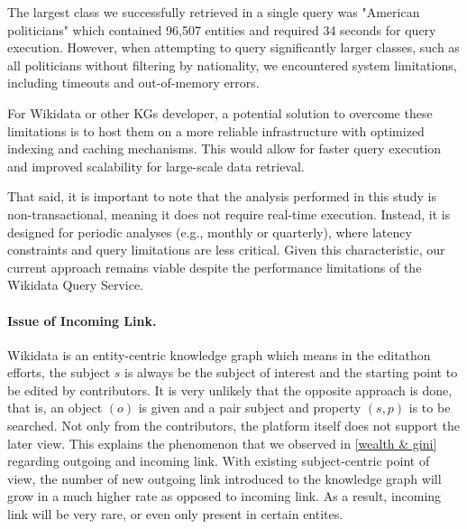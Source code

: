 The largest class we successfully retrieved in a single query was "American politicians" which contained 96,507 entities and required 34 seconds for query execution. However, when attempting to query significantly larger classes, such as all politicians without filtering by nationality, we encountered system limitations, including timeouts and out-of-memory errors.

For Wikidata or other KGs developer, a potential solution to overcome these limitations is to host them on a more reliable infrastructure with optimized indexing and caching mechanisms. This would allow for faster query execution and improved scalability for large-scale data retrieval.

That said, it is important to note that the analysis performed in this study is non-transactional, meaning it does not require real-time execution. Instead, it is designed for periodic analyses (e.g., monthly or quarterly), where latency constraints and query limitations are less critical. Given this characteristic, our current approach remains viable despite the performance limitations of the Wikidata Query Service.


\paragraph{Issue of Incoming Link.}
Wikidata is an entity-centric knowledge graph which means in the editathon efforts, the subject \(s\) is always be the subject of interest and the starting point to be edited by contributors. It is very unlikely that the opposite approach is done, that is, an object \((o)\) is given and a pair subject and property \((s, p)\) is to be searched. Not only from the contributors, the platform itself does not support the later view. This explains the phenomenon that we observed in \autoref{wealth & gini} regarding outgoing and incoming link. With existing subject-centric point of view, the number of new outgoing link introduced to the knowledge graph will grow in a much higher rate as opposed to incoming link. As a result, incoming link will be very rare, or even only present in certain entites.

